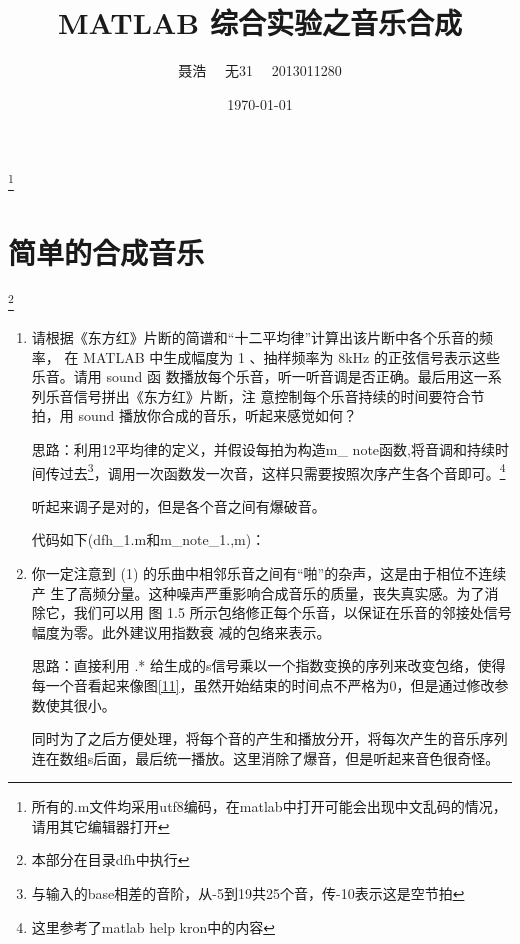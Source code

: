 \documentclass{ctexart}
\title{MATLAB 综合实验之音乐合成}
\author{聂浩~~ 无31~~ 2013011280}
\date{\today}
\begin{document}
\maketitle\footnote{所有的.m文件均采用utf8编码，在matlab中打开可能会出现中文乱码的情况，请用其它编辑器打开}
\section{简单的合成音乐}
\footnote{本部分在目录dfh中执行}
\begin{enumerate}
    \item{请根据《东方红》片断的简谱和“十二平均律”计算出该片断中各个乐音的频率，
            在 MATLAB 中生成幅度为 1 、抽样频率为 8kHz 的正弦信号表示这些乐音。请用 sound 函
            数播放每个乐音，听一听音调是否正确。最后用这一系列乐音信号拼出《东方红》片断，注
        意控制每个乐音持续的时间要符合节拍，用 sound 播放你合成的音乐，听起来感觉如何？}

        思路：利用12平均律的定义，并假设每拍为构造m\_ note函数,将音调和持续时间传过去\footnote{与输入的base相差的音阶，从-5到19共25个音，传-10表示这是空节拍}，调用一次函数发一次音，这样只需要按照次序产生各个音即可。\footnote{这里参考了matlab help kron中的内容}

        听起来调子是对的，但是各个音之间有爆破音。

        代码如下(dfh\_1.m和m\_note\_1.,m)：

        
        

    \item{
            你一定注意到 (1) 的乐曲中相邻乐音之间有“啪”的杂声，这是由于相位不连续产
            生了高频分量。这种噪声严重影响合成音乐的质量，丧失真实感。为了消除它，我们可以用
            图 1.5 所示包络修正每个乐音，以保证在乐音的邻接处信号幅度为零。此外建议用指数衰
            减的包络来表示。
        }

        思路：直接利用 .* 给生成的s信号乘以一个指数变换的序列来改变包络，使得每一个音看起来像图\ref{11}，虽然开始结束的时间点不严格为0，但是通过修改参数使其很小。

        同时为了之后方便处理，将每个音的产生和播放分开，将每次产生的音乐序列连在数组s后面，最后统一播放。这里消除了爆音，但是听起来音色很奇怪。


\end{enumerate}
\end{document}
